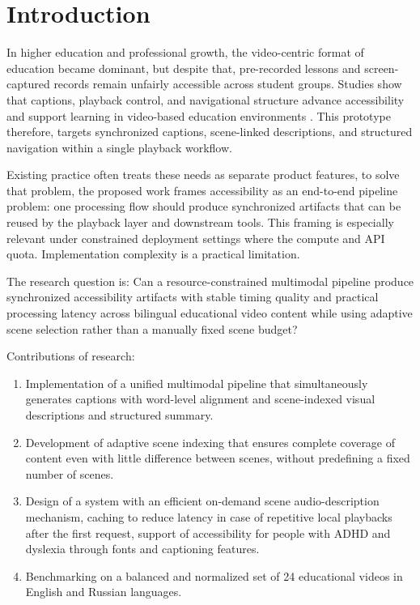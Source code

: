 ﻿\documentclass[conference]{IEEEtran}
\begin{document}
\section{Introduction}
In higher education and professional growth, the video-centric format of education became dominant, but despite that, pre-recorded lessons and screen-captured records remain unfairly accessible across student groups. Studies show that captions, playback control, and navigational structure advance accessibility and support learning in video-based education environments \cite{Gernsbacher2015,Mayer2020,Horlin2024}. This prototype therefore, targets synchronized captions, scene-linked descriptions, and structured navigation within a single playback workflow.

Existing practice often treats these needs as separate product features, to solve that problem, the proposed work frames accessibility as an end-to-end pipeline problem: one processing flow should produce synchronized artifacts that can be reused by the playback layer and downstream tools. This framing is especially relevant under constrained deployment settings where the compute and API quota. Implementation complexity is a practical limitation.

The research question is: Can a resource-constrained multimodal pipeline produce synchronized accessibility artifacts with stable timing quality and practical processing latency across bilingual educational video content while using adaptive scene selection rather than a manually fixed scene budget?

Contributions of research:
\begin{enumerate}
\item Implementation of a unified multimodal pipeline that simultaneously generates captions with word-level alignment and scene-indexed visual descriptions and structured summary.
\item Development of adaptive scene indexing that ensures complete coverage of content even with little difference between scenes, without predefining a fixed number of scenes.
\item Design of a system with an efficient on-demand scene audio-description mechanism, caching to reduce latency in case of repetitive local playbacks after the first request, support of accessibility for people with ADHD and dyslexia through fonts and captioning features.
\item Benchmarking on a balanced and normalized set of 24 educational videos in English and Russian languages.
\end{enumerate}
\end{document}
